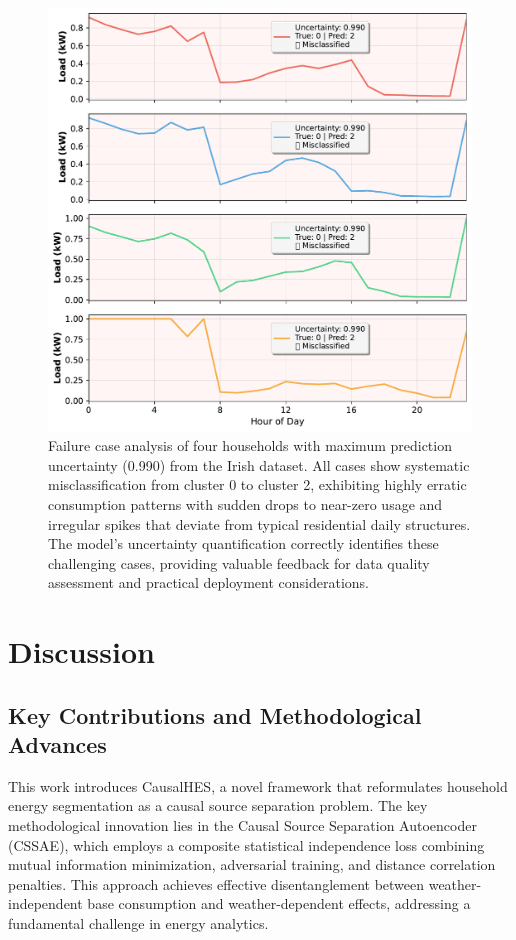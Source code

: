 \documentclass[journal]{IEEEtran}
\begin{document}
\begin{figure}[t!]
\centering
\includegraphics[width=1\columnwidth]{images/failure_case_analysis.pdf}
\caption{Failure case analysis of four households with maximum prediction uncertainty (0.990) from the Irish dataset. All cases show systematic misclassification from cluster 0 to cluster 2, exhibiting highly erratic consumption patterns with sudden drops to near-zero usage and irregular spikes that deviate from typical residential daily structures. The model's uncertainty quantification correctly identifies these challenging cases, providing valuable feedback for data quality assessment and practical deployment considerations.}
\label{fig:failure_case}
\end{figure}

\section{Discussion}

\subsection{Key Contributions and Methodological Advances}
This work introduces CausalHES, a novel framework that reformulates household energy segmentation as a causal source separation problem. The key methodological innovation lies in the Causal Source Separation Autoencoder (CSSAE), which employs a composite statistical independence loss combining mutual information minimization, adversarial training, and distance correlation penalties. This approach achieves effective disentanglement between weather-independent base consumption and weather-dependent effects, addressing a fundamental challenge in energy analytics.
\end{document}
